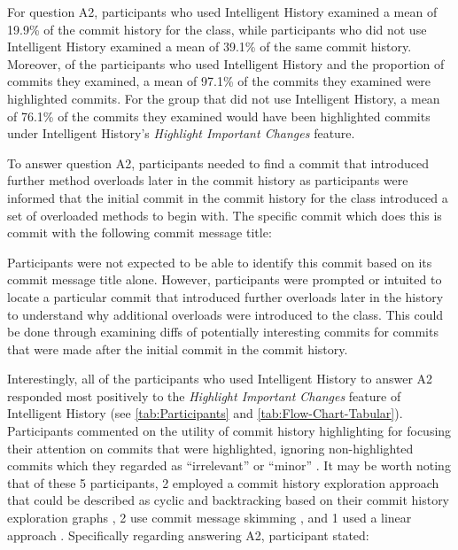 For question A2, participants who used Intelligent History examined a mean of 19.9\% of the commit history for the  class,
while participants who did not use Intelligent History examined a mean of 39.1\% of the same commit history. 
Moreover, of the participants who used Intelligent History and the proportion of commits they examined,
a mean of 97.1\% of the commits they examined were highlighted commits.
For the group that did not use Intelligent History, a mean of 76.1\% of the commits they examined would have been highlighted commits under Intelligent History's \textit{Highlight Important Changes} feature.

To answer question A2, participants needed to find a commit that introduced further \newline 
{} method overloads later in the commit history as participants were informed that the initial commit in the commit history for the  class introduced a set of overloaded  methods to begin with.
The specific commit which does this is commit  with the following commit message title:

\begin{center}
\end{center}

Participants were not expected to be able to identify this commit based on its commit message title alone.
However, participants were prompted or intuited to locate a particular commit that introduced further overloads later in the history to understand why additional overloads were introduced to the  class.
This could be done through examining diffs of potentially interesting commits for commits that were made after the initial commit in the  commit history.

Interestingly, all of the participants who used Intelligent History to answer A2 responded most positively to the \textit{Highlight Important Changes} feature of Intelligent History  (see \autoref{tab:Participants} and \autoref{tab:Flow-Chart-Tabular}).
Participants commented on the utility of commit history highlighting for focusing their attention on commits that were highlighted, ignoring non-highlighted commits which they regarded as ``irrelevant'' or ``minor'' .
It may be worth noting that of these 5 participants, 2 employed a commit history exploration approach that could be described as cyclic and backtracking based on their commit history exploration graphs ,
2 use commit message skimming , and 1 used a linear approach .
Specifically regarding answering A2, participant  stated:

